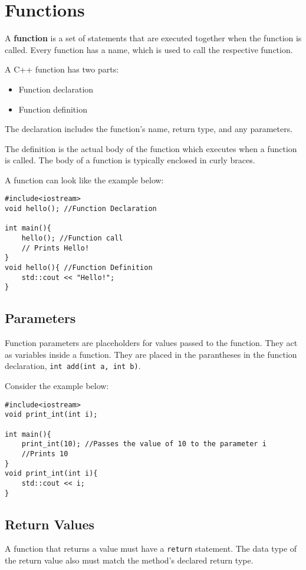 \chapter{Functions}
A \textbf{function} is a set of statements that are executed together when the function is called. Every function has a name, which is used to call the respective function.

A C++ function has two parts:

\begin{itemize}
    \item Function declaration
    \item Function definition
\end{itemize}

The declaration includes the function’s name, return type, and any parameters.

The definition is the actual body of the function which executes when a function is called. The body of a function is typically enclosed in curly braces.

\noindent A function can look like the example below:  
\begin{verbatim}
#include<iostream>
void hello(); //Function Declaration 

int main(){
    hello(); //Function call
    // Prints Hello!
}
void hello(){ //Function Definition
    std::cout << "Hello!";
}
\end{verbatim}

\section{Parameters}
Function parameters are placeholders for values passed to the function. They act as variables inside a function.
They are placed in the parantheses in the function declaration, \verb!int add(int a, int b)!. 

Consider the example below: 
\begin{verbatim}
#include<iostream>
void print_int(int i);

int main(){
    print_int(10); //Passes the value of 10 to the parameter i
    //Prints 10
}
void print_int(int i){
    std::cout << i;
}
\end{verbatim}

\section{Return Values}
A function that returns a value must have a \verb!return! statement. The data type of the return value also must match the method’s declared return type.

